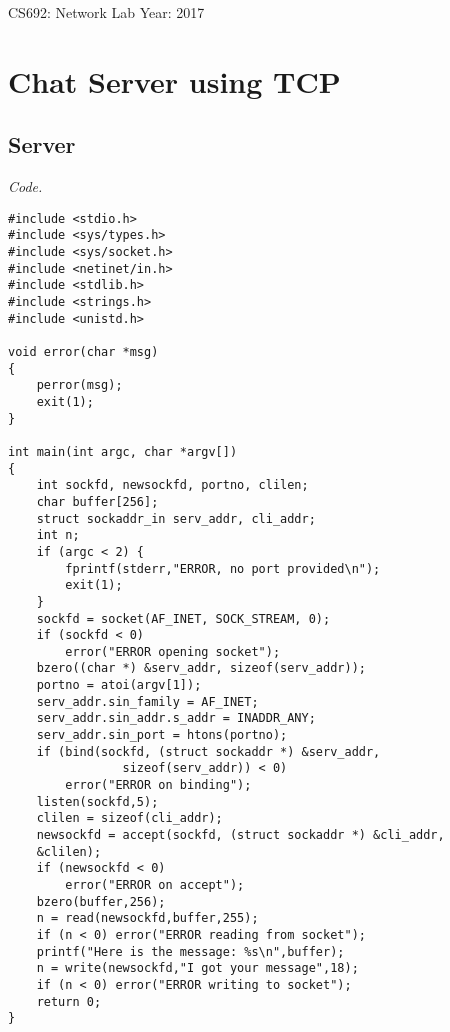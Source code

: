 \documentclass[12pt]{article}
\date{ }
\begin{document}
\tableofcontents

\newpage

CS692: Network Lab \hfill 
Year: 2017
\vspace{5mm}

\section{Chat Server using TCP}

\subsection{Server}

\textit{Code.}

\begin{lstlisting}
#include <stdio.h>
#include <sys/types.h> 
#include <sys/socket.h>
#include <netinet/in.h>
#include <stdlib.h>
#include <strings.h>
#include <unistd.h>

void error(char *msg)
{
	perror(msg);
	exit(1);
}

int main(int argc, char *argv[])
{
	int sockfd, newsockfd, portno, clilen;
	char buffer[256];
	struct sockaddr_in serv_addr, cli_addr;
	int n;
	if (argc < 2) {
		fprintf(stderr,"ERROR, no port provided\n");
		exit(1);
	}
	sockfd = socket(AF_INET, SOCK_STREAM, 0);
	if (sockfd < 0) 
		error("ERROR opening socket");
	bzero((char *) &serv_addr, sizeof(serv_addr));
	portno = atoi(argv[1]);
	serv_addr.sin_family = AF_INET;
	serv_addr.sin_addr.s_addr = INADDR_ANY;
	serv_addr.sin_port = htons(portno);
	if (bind(sockfd, (struct sockaddr *) &serv_addr,
				sizeof(serv_addr)) < 0) 
		error("ERROR on binding");
	listen(sockfd,5);
	clilen = sizeof(cli_addr);
	newsockfd = accept(sockfd, (struct sockaddr *) &cli_addr, 
	&clilen);
	if (newsockfd < 0) 
		error("ERROR on accept");
	bzero(buffer,256);
	n = read(newsockfd,buffer,255);
	if (n < 0) error("ERROR reading from socket");
	printf("Here is the message: %s\n",buffer);
	n = write(newsockfd,"I got your message",18);
	if (n < 0) error("ERROR writing to socket");
	return 0; 
}

\end{lstlisting}
\end{document}
